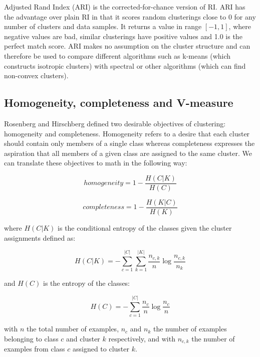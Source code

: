 \documentclass[conference]{IEEEtran}
\begin{document}
Adjusted Rand Index (ARI) is the corrected-for-chance version of RI.
ARI has the advantage over plain RI in that it scores random 
clusterings close to 0 for any number of clusters and data samples. It returns
a value in range $[-1, 1]$, where negative values are bad, similar clusterings have
positive values and 1.0 is the perfect match score. ARI makes no assumption on the cluster
structure and can therefore be used to compare different algorithms such as k-means (which
constructs isotropic clusters) with spectral or other algorithms (which can find non-convex
clusters).

\subsection{Homogeneity, completeness and V-measure}
Rosenberg and Hirschberg \cite{rosenberg07} defined two desirable objectives of clustering: homogeneity and
completeness. Homogeneity refers to a desire that each cluster should contain only members
of a single class whereas completeness expresses the aspiration that all members of a given
class are assigned to the same cluster.
We can translate these objectives to math in the following way:

\begin{equation}
\label{homogeneity}
homogeneity = 1 - \frac{H(C|K)}{H(C)}
\end{equation}

\begin{equation}
\label{completeness}
completeness = 1 - \frac{H(K|C)}{H(K)}
\end{equation}

where $H(C|K)$ is the conditional entropy of the classes given the cluster assignments defined as:

\begin{equation}
\label{hck}
H(C|K) = - \sum\limits_{c=1}^{|C|}\sum\limits_{k=1}^{|K|}\frac{n_{c,k}}{n} \log{\frac{n_{c,k}}{n_k}}
\end{equation}

and $H(C)$ is the entropy of the classes:

\begin{equation}
\label{hc}
H(C) = - \sum\limits_{c=1}^{|C|}\frac{n_c}{n} \log{\frac{n_c}{n}}
\end{equation}

with $n$ the total number of examples, $n_c$ and $n_k$ the number of examples belonging to class
$c$ and cluster $k$ respectively, and with $n_{c,k}$ the number of examples from class $c$ assigned
to cluster $k$.
\end{document}
